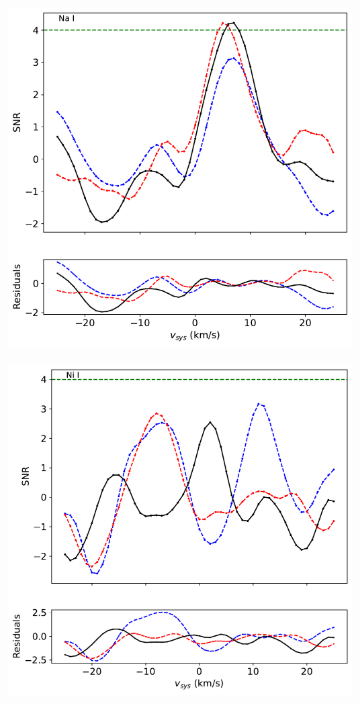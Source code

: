 \documentclass[twocolumn]{aastex631}
\begin{document}
\begin{figure}[ht!]
\begin{subfigure}[b]{0.3\textwidth}
            \end{subfigure}
            \begin{subfigure}[b]{0.3\textwidth}
                \centering
                \includegraphics[width=\textwidth]{plots-updated/line-profile-overlaidarms/KELT-20b.20190504.combined.Na I.line-profiles-overlaidarms.pdf}
            \end{subfigure}
            \begin{subfigure}[b]{0.3\textwidth}
                \centering
                \includegraphics[width=\textwidth]{plots-updated/line-profile-overlaidarms/KELT-20b.20190504.combined.Ni I.line-profiles-overlaidarms.pdf}
            \end{subfigure}
            \caption{}
            \label{fig:fig}
        \end{figure}
\end{document}
